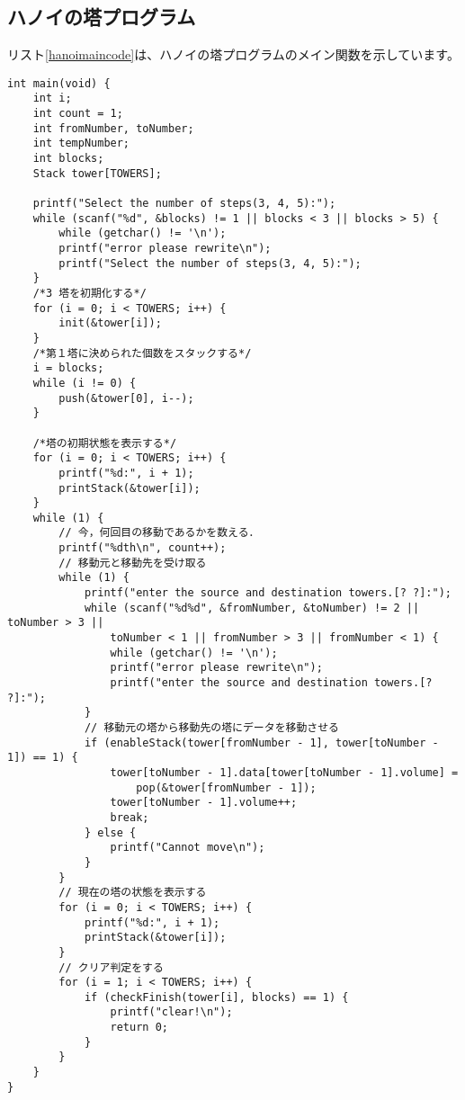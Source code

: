 \documentclass[a4j]{jarticle}
\begin{document}
\subsection{ハノイの塔プログラム}
リスト\ref{hanoimaincode}は、ハノイの塔プログラムのメイン関数を示しています。
\begin{lstlisting}[caption=ハノイの塔のメイン関数,label=hanoimaincode]
  int main(void) {
    int i;
    int count = 1;
    int fromNumber, toNumber;
    int tempNumber;
    int blocks;
    Stack tower[TOWERS];

    printf("Select the number of steps(3, 4, 5):");
    while (scanf("%d", &blocks) != 1 || blocks < 3 || blocks > 5) {
        while (getchar() != '\n');
        printf("error please rewrite\n");
        printf("Select the number of steps(3, 4, 5):");
    }
    /*3 塔を初期化する*/
    for (i = 0; i < TOWERS; i++) {
        init(&tower[i]);
    }
    /*第１塔に決められた個数をスタックする*/
    i = blocks;
    while (i != 0) {
        push(&tower[0], i--);
    }

    /*塔の初期状態を表示する*/
    for (i = 0; i < TOWERS; i++) {
        printf("%d:", i + 1);
        printStack(&tower[i]);
    }
    while (1) {
        // 今，何回目の移動であるかを数える．
        printf("%dth\n", count++);
        // 移動元と移動先を受け取る
        while (1) {
            printf("enter the source and destination towers.[? ?]:");
            while (scanf("%d%d", &fromNumber, &toNumber) != 2 || toNumber > 3 ||
                toNumber < 1 || fromNumber > 3 || fromNumber < 1) {
                while (getchar() != '\n');
                printf("error please rewrite\n");
                printf("enter the source and destination towers.[? ?]:");
            }
            // 移動元の塔から移動先の塔にデータを移動させる
            if (enableStack(tower[fromNumber - 1], tower[toNumber - 1]) == 1) {
                tower[toNumber - 1].data[tower[toNumber - 1].volume] =
                    pop(&tower[fromNumber - 1]);
                tower[toNumber - 1].volume++;
                break;
            } else {
                printf("Cannot move\n");
            }
        }
        // 現在の塔の状態を表示する
        for (i = 0; i < TOWERS; i++) {
            printf("%d:", i + 1);
            printStack(&tower[i]);
        }
        // クリア判定をする
        for (i = 1; i < TOWERS; i++) {
            if (checkFinish(tower[i], blocks) == 1) {
                printf("clear!\n");
                return 0;
            }
        }
    }
}
\end{lstlisting}
\end{document}
